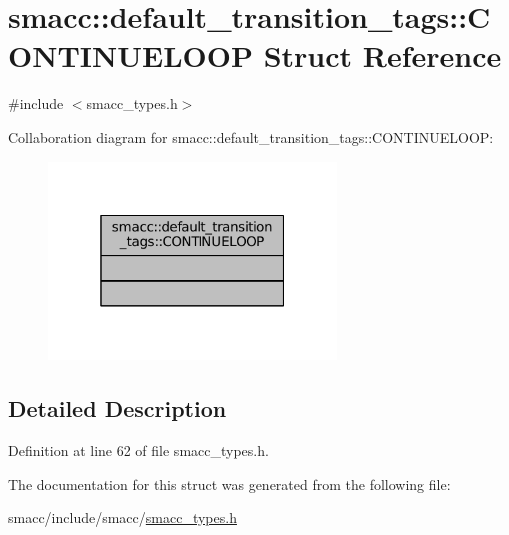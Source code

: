\hypertarget{structsmacc_1_1default__transition__tags_1_1CONTINUELOOP}{}\section{smacc\+:\+:default\+\_\+transition\+\_\+tags\+:\+:C\+O\+N\+T\+I\+N\+U\+E\+L\+O\+OP Struct Reference}
\label{structsmacc_1_1default__transition__tags_1_1CONTINUELOOP}


{\ttfamily \#include $<$smacc\+\_\+types.\+h$>$}



Collaboration diagram for smacc\+:\+:default\+\_\+transition\+\_\+tags\+:\+:C\+O\+N\+T\+I\+N\+U\+E\+L\+O\+OP\+:
\nopagebreak
\begin{figure}[H]
\begin{center}
\leavevmode
\includegraphics[width=217pt]{structsmacc_1_1default__transition__tags_1_1CONTINUELOOP__coll__graph}
\end{center}
\end{figure}


\subsection{Detailed Description}


Definition at line 62 of file smacc\+\_\+types.\+h.



The documentation for this struct was generated from the following file\+:\begin{DoxyCompactItemize}
\item 
smacc/include/smacc/\hyperlink{smacc__types_8h}{smacc\+\_\+types.\+h}\end{DoxyCompactItemize}
